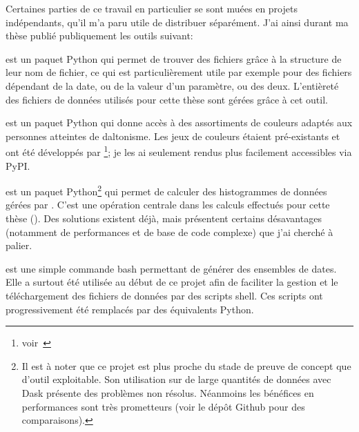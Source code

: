 \bigskip

Certaines parties de ce travail en particulier se sont muées en projets indépendants, qu'il m'a paru utile de distribuer séparément.
J'ai ainsi durant ma thèse publié publiquement les outils suivant:
\begin{description}
  \setlength{\itemsep}{1.8\onelineskip}
  \item[FileFinder]
        est un paquet Python qui permet  de trouver des fichiers grâce à la structure de leur nom de fichier, ce qui est particulièrement utile par exemple pour des fichiers dépendant de la date, ou de la valeur d'un paramètre, ou des deux.
        L'entièreté des fichiers de données utilisés pour cette thèse sont gérées grâce à cet outil.

  \item[tol-colors]
        est un paquet Python qui donne accès à des assortiments de couleurs adaptés aux personnes atteintes de daltonisme.
        Les jeux de couleurs étaient pré-existants et ont été développés par \footnote{voir~}; je les ai seulement rendus plus facilement accessibles via PyPI.

  \item[Xarray-histogram]
        est un paquet Python\footnote{%
        Il est à noter que ce projet est plus proche du stade de preuve de concept que d'outil exploitable.
        Son utilisation sur de large quantités de données avec Dask présente des problèmes non résolus.
        Néanmoins les bénéfices en performances sont très prometteurs (voir le dépôt Github pour des comparaisons).
        } qui permet de calculer des histogrammes de données gérées par .
        C'est une opération centrale dans les calculs effectués pour cette thèse ().
        Des solutions existent déjà, mais présentent certains désavantages (notamment de performances et de base de code complexe) que j'ai cherché à palier.

  \item[dateloop]
        est une simple commande bash permettant de générer des ensembles de dates.
        Elle a surtout été utilisée au début de ce projet afin de faciliter la gestion et le téléchargement des fichiers de données par des scripts shell. Ces scripts ont progressivement été remplacés par des équivalents Python.

\end{description}


